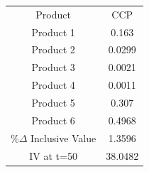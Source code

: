 \begin{tabular}{cc}
Product & CCP \\
Product 1 & 0.163 \\
Product 2 & 0.0299 \\
Product 3 & 0.0021 \\
Product 4 & 0.0011 \\
Product 5 & 0.307 \\
Product 6 & 0.4968 \\
$\%\Delta$ Inclusive Value & 1.3596 \\
IV at t=50 & 38.0482 \\
\end{tabular}